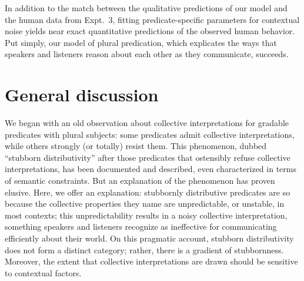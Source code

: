 \documentclass[linguex]{sp}
\begin{document}
In addition to the match between the qualitative predictions of our model and the human data from Expt.~3, fitting predicate-specific parameters for contextual noise yields near exact quantitative predictions of the observed human behavior. Put simply, our model of plural predication, which explicates the ways that speakers and listeners reason about each other as they communicate, succeeds. %


\section{General discussion}

We began with an old observation about collective interpretations for gradable predicates with plural subjects: some predicates admit collective interpretations, while others strongly (or totally) resist them. This phenomenon, dubbed ``stubborn distributivity'' after those predicates that ostensibly refuse collective interpretations, has been documented and described, even characterized in terms of semantic constraints. But an explanation of the phenomenon has proven elusive. Here, we offer an explanation: stubbornly distributive predicates are so because the collective properties they name are unpredictable, or unstable, in most contexts; this unpredictability results in a noisy collective interpretation, something speakers and listeners recognize as ineffective for communicating efficiently about their world.
On this pragmatic account, stubborn distributivity does not form a distinct category; rather, there is a gradient of stubbornness. Moreover, the extent that collective interpretations are drawn should be sensitive to contextual factors.

\end{document}
